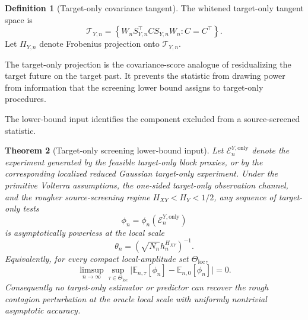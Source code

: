 \documentclass[11pt,a4paper]{amsart}
\theoremstyle{plain}
\newtheorem{theorem}{Theorem}[section]
\theoremstyle{definition}
\newtheorem{definition}[theorem]{Definition}
\theoremstyle{remark}
\newcommand{\EE}{\mathbb{E}}
\newcommand{\scrT}{\mathcal{T}}
\begin{document}
\begin{definition}[Target-only covariance tangent]\label{def:target-tangent}
The whitened target-only tangent space is
\[
        \scrT_{Y,n}
        =
        \left\{
        W_n S_{Y,n}^{\top} C S_{Y,n} W_n
        :
        C=C^\top
        \right\}.
\]
Let \(\Pi_{Y,n}\) denote Frobenius projection onto \(\scrT_{Y,n}\).
\end{definition}

The target-only projection is the covariance-score analogue of residualizing the target future on
the target past.  It prevents the statistic from drawing power from information that the screening
lower bound assigns to target-only procedures.

The lower-bound input identifies the component excluded from a source-screened statistic.

\begin{theorem}[Target-only screening lower-bound input]\label{thm:target-only-input}
Let \(\mathcal E_n^{Y,\mathrm{only}}\) denote the experiment generated by the feasible target-only
block proxies, or by the corresponding localized reduced Gaussian target-only experiment.  Under
the primitive Volterra assumptions, the one-sided target-only observation channel, and the rougher
source-screening regime \(H_{XY}<H_Y<1/2\), any sequence of target-only tests
\[
        \phi_n=\phi_n(\mathcal E_n^{Y,\mathrm{only}})
\]
is asymptotically powerless at the local scale
\[
        \theta_n=(\sqrt{N_n}h_n^{H_{XY}})^{-1}.
\]
Equivalently, for every compact local-amplitude set \(\Theta_{\mathrm{loc}}\),
\[
        \limsup_{n\to\infty}
        \sup_{\tau\in\Theta_{\mathrm{loc}}}
        \bigl|
        \EE_{n,\tau}[\phi_n]-\EE_{n,0}[\phi_n]
        \bigr|
        =
        0.
\]
Consequently no target-only estimator or predictor can recover the rough contagion perturbation at
the oracle local scale with uniformly nontrivial asymptotic accuracy.
\end{theorem}
\end{document}
